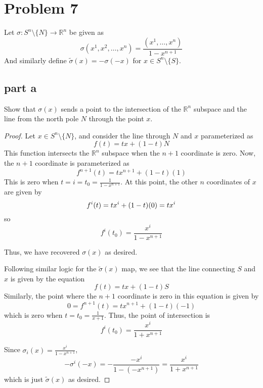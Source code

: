 \documentclass[fontsize=11pt]{scrartcl} %
\numberwithin{equation}{section} %
\numberwithin{figure}{section} %
\numberwithin{table}{section} %
\begin{document}


\section*{Problem 7}
Let $\sigma:S^n\setminus\{N\}\to \mathbb{R}^n$ be given as
\[
\sigma(x^1, x^2,\ldots,x^n) = \frac{(x^1,\ldots,x^n)}{1-x^{n+1}}
\]
And similarly define $\widetilde{\sigma}(x) = -\sigma(-x)$ for $x\in S^n\setminus\{S\}$.

\subsection*{part a}
Show that $\sigma(x)$ sends a point to the intersection of the $\mathbb{R}^n$ subspace
and the line from the north pole $N$ through the point $x$.
\\
\begin{proof}
Let $x\in S^n\setminus\{N\}$, and consider the line through $N$ and $x$ parameterized as
\[
f(t) = tx + (1-t)N
\]
This function intersects the $\mathbb{R}^n$ subspace when the $n+1$ coordinate is zero.
Now, the $n+1$ coordinate is parameterized as
\[
f^{n+1}(t) = tx^{n+1} + (1-t)(1)
\]
This is zero when $t=i=t_0=\frac{1}{1-x^{n+1}}$. At this point, the other $n$ coordinates of
$x$ are given by
\[
f^i(t) = tx^i + (1-t)(0)\\
       = tx^i
\]
so
\[
f^i(t_0) = \frac{x^i}{1-x^{n+1}}
\]

Thus, we have recovered $\sigma(x)$ as desired.

Following similar logic for the $\widetilde{\sigma}(x)$ map, we see that the line connecting
$S$ and $x$ is given by the equation
\[
f(t) = tx + (1-t)S
\]
Similarly, the point where the $n+1$ coordinate is zero in this equation is given by
\[
0=f^{n+1}(t)=tx^{n+1} + (1-t)(-1)
\]
which is zero when $t=t_0=\frac{1}{x+1}$. Thus, the point of intersection is
\[
f^i(t_0) = \frac{x^i}{1+x^{n+1}}
\]

Since $\sigma_i(x) = \frac{x^i}{1-x^{n+1}}$, 
\[
-\sigma^i(-x) = -\frac{-x^i}{1-(-x^{n+1})} = \frac{x^i}{1+x^{n+1}}
\]
which is just $\widetilde{\sigma}(x)$ as desired.

\end{proof}
\end{document}
